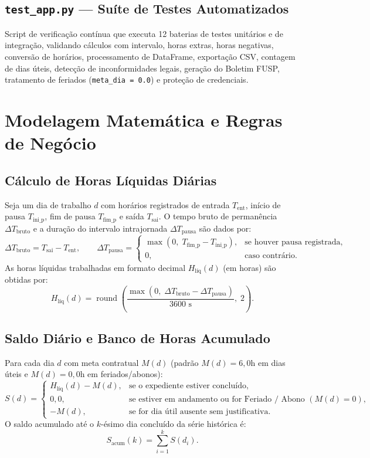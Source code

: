\documentclass[11pt,a4paper]{article}
\begin{document}
\subsection{\texttt{test\_app.py} --- Suíte de Testes Automatizados}
Script de verificação contínua que executa 12 baterias de testes unitários e de integração, validando cálculos com intervalo, horas extras, horas negativas, conversão de horários, processamento de DataFrame, exportação CSV, contagem de dias úteis, detecção de inconformidades legais, geração do Boletim FUSP, tratamento de feriados (\texttt{meta\_dia = 0.0}) e proteção de credenciais.

\section{Modelagem Matemática e Regras de Negócio}

\subsection{Cálculo de Horas Líquidas Diárias}
Seja um dia de trabalho $d$ com horários registrados de entrada $T_{\text{ent}}$, início de pausa $T_{\text{ini\_p}}$, fim de pausa $T_{\text{fim\_p}}$ e saída $T_{\text{sai}}$. O tempo bruto de permanência $\Delta T_{\text{bruto}}$ e a duração do intervalo intrajornada $\Delta T_{\text{pausa}}$ são dados por:
\[
\Delta T_{\text{bruto}} = T_{\text{sai}} - T_{\text{ent}}, \qquad
\Delta T_{\text{pausa}} = 
\begin{cases} 
\max(0, \; T_{\text{fim\_p}} - T_{\text{ini\_p}}), & \text{se houver pausa registrada}, \\
0, & \text{caso contrário}.
\end{cases}
\]
As horas líquidas trabalhadas em formato decimal $H_{\text{líq}}(d)$ (em horas) são obtidas por:
\[
H_{\text{líq}}(d) = \operatorname{round}\!\left(\frac{\max(0, \; \Delta T_{\text{bruto}} - \Delta T_{\text{pausa}})}{3600\text{ s}}, \; 2\right).
\]

\subsection{Saldo Diário e Banco de Horas Acumulado}
Para cada dia $d$ com meta contratual $M(d)$ (padrão $M(d) = 6,0\text{h}$ em dias úteis e $M(d) = 0,0\text{h}$ em feriados/abonos):
\[
S(d) = 
\begin{cases}
H_{\text{líq}}(d) - M(d), & \text{se o expediente estiver concluído}, \\
0,0, & \text{se estiver em andamento ou for Feriado / Abono } (M(d) = 0), \\
-M(d), & \text{se for dia útil ausente sem justificativa}.
\end{cases}
\]
O saldo acumulado até o $k$-ésimo dia concluído da série histórica é:
\[
S_{\text{acum}}(k) = \sum_{i=1}^{k} S(d_i).
\]
\end{document}
